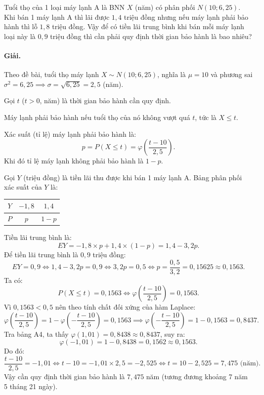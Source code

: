 \begin{vidu}[VD 3]
Tuổi thọ của 1 loại máy lạnh A là BNN $X$ (năm) có phân phối $N(10; 6{,}25)$. Khi bán 1 máy lạnh A thì lãi được $1{,}4$ triệu đồng nhưng nếu máy lạnh phải bảo hành thì lỗ $1{,}8$ triệu đồng. Vậy để có tiền lãi trung bình khi bán mỗi máy lạnh loại này là $0{,}9$ triệu đồng thì cần phải quy định thời gian bảo hành là bao nhiêu?

\paragraph{Giải.}
Theo đề bài, tuổi thọ máy lạnh $X \sim N(10; 6{,}25)$, nghĩa là $\mu = 10$ và phương sai $\sigma^2 = 6{,}25 \implies \sigma = \sqrt{6{,}25} = 2{,}5$ (năm).

Gọi $t$ ($t > 0$, năm) là thời gian bảo hành cần quy định.

Máy lạnh phải bảo hành nếu tuổi thọ của nó không vượt quá $t$, tức là $X \le t$.

Xác suất (tỉ lệ) máy lạnh phải bảo hành là:
\[
p = P(X \le t) = \varphi\left(\frac{t - 10}{2{,}5}\right).
\]
Khi đó tỉ lệ máy lạnh không phải bảo hành là $1 - p$.

Gọi $Y$ (triệu đồng) là tiền lãi thu được khi bán 1 máy lạnh A. Bảng phân phối xác suất của $Y$ là:
\begin{center}
\renewcommand{\arraystretch}{1.3}
\begin{tabular}{|c|c|c|}
\hline
$Y$ & $-1{,}8$ & $1{,}4$ \\
\hline
$P$ & $p$ & $1 - p$ \\
\hline
\end{tabular}
\end{center}
Tiền lãi trung bình là:
\[
EY = -1{,}8 \times p + 1{,}4 \times (1 - p) = 1{,}4 - 3{,}2p.
\]
Để tiền lãi trung bình là $0{,}9$ triệu đồng:
\[
EY = 0{,}9 \iff 1{,}4 - 3{,}2p = 0{,}9 \iff 3{,}2p = 0{,}5 \iff p = \frac{0{,}5}{3{,}2} = 0{,}15625 \approx 0{,}1563.
\]
Ta có:
\[
P(X \le t) = 0{,}1563 \iff \varphi\left(\frac{t - 10}{2{,}5}\right) = 0{,}1563.
\]
Vì $0{,}1563 < 0{,}5$ nên theo tính chất đối xứng của hàm Laplace:
\[
\varphi\left(\frac{t - 10}{2{,}5}\right) = 1 - \varphi\left(-\frac{t - 10}{2{,}5}\right) = 0{,}1563 \implies \varphi\left(-\frac{t - 10}{2{,}5}\right) = 1 - 0{,}1563 = 0{,}8437.
\]
Tra bảng A4, ta thấy $\varphi(1{,}01) = 0{,}8438 \approx 0{,}8437$, suy ra:
\[
\varphi(-1{,}01) = 1 - 0{,}8438 = 0{,}1562 \approx 0{,}1563.
\]
Do đó:
\[
\frac{t - 10}{2{,}5} = -1{,}01 \iff t - 10 = -1{,}01 \times 2{,}5 = -2{,}525 \iff t = 10 - 2{,}525 = 7{,}475 \text{ (năm)}.
\]
Vậy cần quy định thời gian bảo hành là $7{,}475$ năm (tương đương khoảng 7 năm 5 tháng 21 ngày).
\end{vidu}

